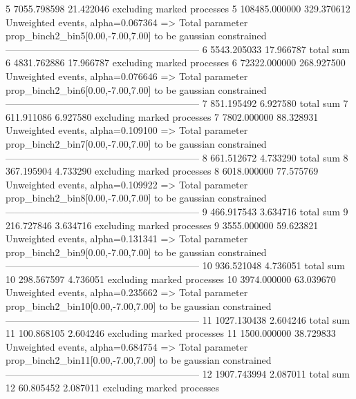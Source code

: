 5          7055.798598     21.422046       excluding marked processes    
5          108485.000000   329.370612      Unweighted events, alpha=0.067364
  => Total parameter prop_binch2_bin5[0.00,-7.00,7.00] to be gaussian constrained
------------------------------------------------------------
6          5543.205033     17.966787       total sum                     
6          4831.762886     17.966787       excluding marked processes    
6          72322.000000    268.927500      Unweighted events, alpha=0.076646
  => Total parameter prop_binch2_bin6[0.00,-7.00,7.00] to be gaussian constrained
------------------------------------------------------------
7          851.195492      6.927580        total sum                     
7          611.911086      6.927580        excluding marked processes    
7          7802.000000     88.328931       Unweighted events, alpha=0.109100
  => Total parameter prop_binch2_bin7[0.00,-7.00,7.00] to be gaussian constrained
------------------------------------------------------------
8          661.512672      4.733290        total sum                     
8          367.195904      4.733290        excluding marked processes    
8          6018.000000     77.575769       Unweighted events, alpha=0.109922
  => Total parameter prop_binch2_bin8[0.00,-7.00,7.00] to be gaussian constrained
------------------------------------------------------------
9          466.917543      3.634716        total sum                     
9          216.727846      3.634716        excluding marked processes    
9          3555.000000     59.623821       Unweighted events, alpha=0.131341
  => Total parameter prop_binch2_bin9[0.00,-7.00,7.00] to be gaussian constrained
------------------------------------------------------------
10         936.521048      4.736051        total sum                     
10         298.567597      4.736051        excluding marked processes    
10         3974.000000     63.039670       Unweighted events, alpha=0.235662
  => Total parameter prop_binch2_bin10[0.00,-7.00,7.00] to be gaussian constrained
------------------------------------------------------------
11         1027.130438     2.604246        total sum                     
11         100.868105      2.604246        excluding marked processes    
11         1500.000000     38.729833       Unweighted events, alpha=0.684754
  => Total parameter prop_binch2_bin11[0.00,-7.00,7.00] to be gaussian constrained
------------------------------------------------------------
12         1907.743994     2.087011        total sum                     
12         60.805452       2.087011        excluding marked processes    
